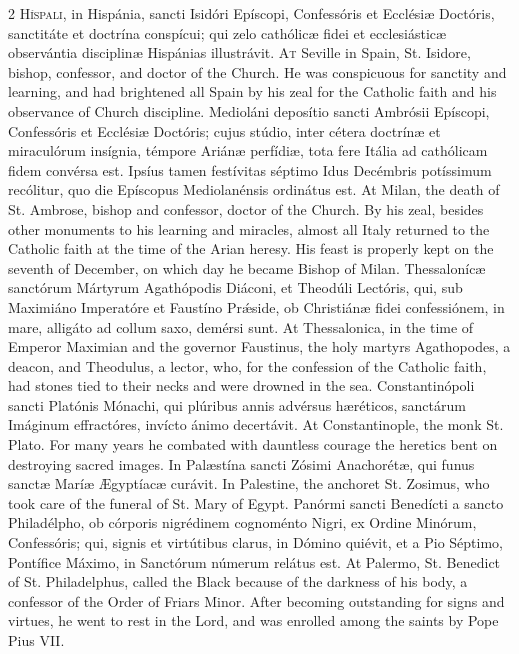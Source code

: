 \begin{paracol}{2}
\lettrine[lines=2]{H}{íspali,} in Hispánia, sancti Isidóri Epíscopi, 
 Confessóris et Ecclésiæ Doctóris, sanctitáte et doctrína conspícui; qui zelo 
 cathólicæ fidei et ecclesiásticæ observántia disciplinæ Hispánias 
 illustrávit.
\switchcolumn
{}
\lettrine[lines=2]{A}{t} Seville in Spain, St. Isidore, bishop, confessor, and doctor of the 
 Church. He was conspicuous for sanctity and learning, and had 
 brightened all Spain by his zeal for the Catholic faith and his observance 
 of Church discipline.
\switchcolumn*
{}
Medioláni deposítio sancti Ambrósii Epíscopi, Confessóris et Ecclésiæ 
 Doctóris; cujus stúdio, inter cétera doctrínæ et miraculórum insígnia, 
 témpore Ariánæ perfídiæ, tota fere Itália ad cathólicam fidem convérsa est. 
 Ipsíus tamen festívitas séptimo Idus Decémbris potíssimum recólitur, quo die 
 Epíscopus Mediolanénsis ordinátus est.
\switchcolumn
{}
At Milan, the death of St. Ambrose, bishop and confessor, doctor of the 
 Church. By his zeal, besides other monuments to his learning and 
 miracles, almost all Italy returned to the Catholic faith at the time of the 
 Arian heresy. His feast is properly kept on the seventh of December, 
 on which day he became Bishop of Milan.
\switchcolumn*
{}
Thessalonícæ sanctórum Mártyrum Agathópodis 
 Diáconi, et Theodúli Lectóris, qui, sub Maximiáno Imperatóre et Faustíno Prǽside, ob Christiánæ fidei confessiónem, in mare, 
 alligáto ad collum saxo, 
 demérsi sunt.
\switchcolumn
{}
At Thessalonica, in the time of Emperor Maximian and the governor Faustinus, 
 the holy martyrs Agathopodes, a deacon, and Theodulus, a lector, who, for 
 the confession of the Catholic faith, had stones tied to their necks and 
 were drowned in the sea.
\switchcolumn*
{}
Constantinópoli sancti Platónis Mónachi, qui plúribus annis advérsus hæréticos, 
 sanctárum Imáginum effractóres, invícto ánimo decertávit.
\switchcolumn
{}
At Constantinople, the monk St. Plato. For many years he combated with 
 dauntless courage the heretics bent on destroying sacred images.
\switchcolumn*
{}
In Palæstína sancti Zósimi Anachorétæ, qui 
 funus sanctæ Maríæ Ægyptíacæ curávit.
\switchcolumn
{}
In Palestine, the anchoret St. Zosimus, who took care of the funeral 
 of St. Mary of Egypt.
\switchcolumn*
{}
Panórmi sancti Benedícti a sancto Philadélpho, ob córporis nigrédinem 
 cognoménto Nigri, ex Ordine Minórum, Confessóris; qui, signis et virtútibus 
 clarus, in Dómino quiévit, et a Pio Séptimo, Pontífice Máximo, in Sanctórum 
 númerum relátus est.
\switchcolumn
{}
At Palermo, St. Benedict of St. Philadelphus, called the Black because of 
 the darkness of his body, a confessor of the Order of Friars Minor. 
 After becoming outstanding for signs and virtues, he went to rest in the 
 Lord, and was enrolled among the saints by Pope Pius VII.
\switchcolumn*
{}
\end{paracol}


